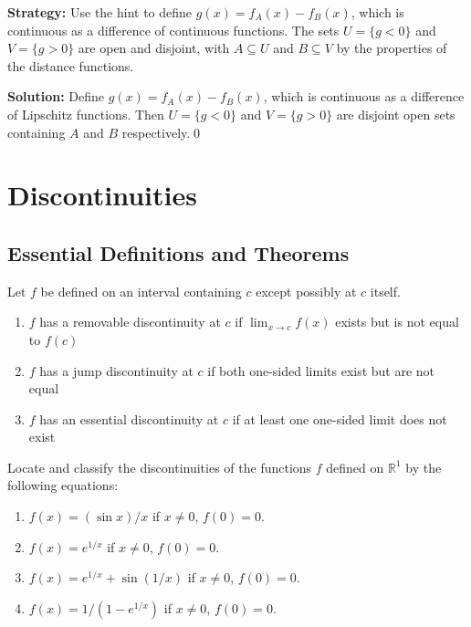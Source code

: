 \noindent\textbf{Strategy:} Use the hint to define $g(x) = f_A(x) - f_B(x)$, which is continuous as a difference of continuous functions. The sets $U = \{g < 0\}$ and $V = \{g > 0\}$ are open and disjoint, with $A \subseteq U$ and $B \subseteq V$ by the properties of the distance functions.

\bigskip\noindent\textbf{Solution:}
Define $g(x)=f_A(x)-f_B(x)$, which is continuous as a difference of Lipschitz functions. Then $U=\{g<0\}$ and $V=\{g>0\}$ are disjoint open sets containing $A$ and $B$ respectively.\qed

\section{Discontinuities}

\subsection*{Essential Definitions and Theorems}

\begin{definition}
Let $f$ be defined on an interval containing $c$ except possibly at $c$ itself.
\begin{enumerate}
\item $f$ has a removable discontinuity at $c$ if $\lim_{x \to c} f(x)$ exists but is not equal to $f(c)$
\item $f$ has a jump discontinuity at $c$ if both one-sided limits exist but are not equal
\item $f$ has an essential discontinuity at $c$ if at least one one-sided limit does not exist
\end{enumerate}
\end{definition}



\begin{problembox}
Locate and classify the discontinuities of the functions $f$ defined on $\mathbb{R}^1$ by the following equations:
\begin{enumerate}[label=(\alph*)]
\item $f(x) = (\sin x)/x$ if $x \neq 0$, $f(0) = 0$.
\item $f(x) = e^{1/x}$ if $x \neq 0$, $f(0) = 0$.
\item $f(x) = e^{1/x} + \sin(1/x)$ if $x \neq 0$, $f(0) = 0$.
\item $f(x) = 1/(1 - e^{1/x})$ if $x \neq 0$, $f(0) = 0$.
\end{enumerate}
\end{problembox}

